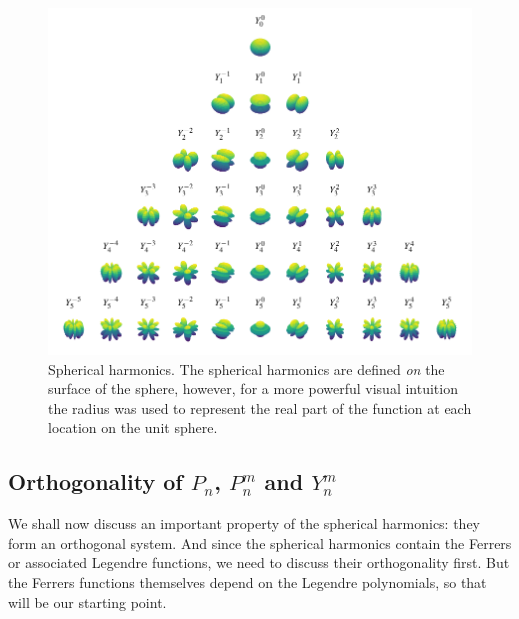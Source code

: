 \begin{figure}
  \centering
  \includegraphics[width=\linewidth]{papers/kugel/figures/python/spherical-harmonics-triangle}
  \caption{
    \label{kugel:fig:spherical-harmonics}
    Spherical harmonics. The spherical harmonics are defined \emph{on} the
    surface of the sphere, however, for a more powerful visual intuition the
    radius was used to represent the real part of the function at each location
    on the unit sphere. 
  }
\end{figure}


\subsection{Orthogonality of $P_n$, $P^m_n$ and $Y^m_n$}
\label{kugel:sec:construction:orthogonality}

We shall now discuss an important property of the spherical harmonics: they form
an orthogonal system. And since the spherical harmonics contain the Ferrers or
associated Legendre functions, we need to discuss their orthogonality first.
But the Ferrers functions themselves depend on the Legendre polynomials, so that
will be our starting point.

